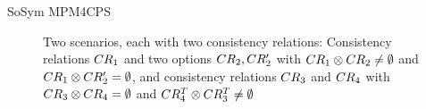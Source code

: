 \begin{copiedFrom}{SoSym MPM4CPS}
\begin{figure}
    \centering
    \begin{subfigure}{\textwidth}
        \centering
        
    \end{subfigure}
    \begin{subfigure}{\textwidth}
        \centering
        
    \end{subfigure}
    \caption{Two scenarios, each with two consistency relations: 
    Consistency relations $CR_{1}$ and two options $CR_{2}, CR'_{2}$ with $CR_{1} \otimes CR_{2} \neq \emptyset$ and $CR_{1} \otimes CR'_{2} = \emptyset$, and consistency relations $CR_{3}$ and $CR_{4}$ with $CR_{3} \otimes CR_{4} = \emptyset$ and $CR^T_{4} \otimes CR^T_{3} \neq \emptyset$}
    \label{fig:correctness:formal:concatenation_example}
\end{figure}


\end{copiedFrom}
